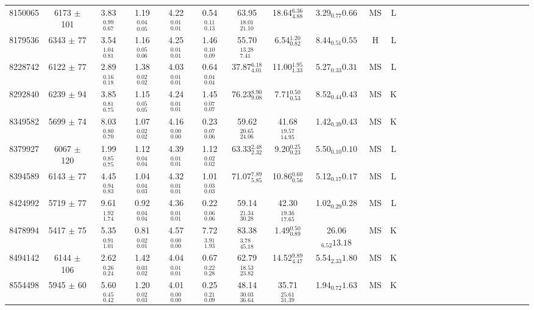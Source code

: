 \begin{table}
\begin{tabular}{cccccccccccccccccccccccccc}
8150065  & 6173 $\pm$ 101& 3.83$_{0.67}^{0.99}$ & 1.19$_{0.05}^{0.04}$ & 4.22$_{0.01}^{0.01}$ & 0.54$_{0.13}^{0.11}$ & 63.95$_{21.10}^{18.01}$ & 18.64$_{4.88}^{6.36}$ & 3.29$_{0.77}{0.66}$ & MS & L \\
8179536  & 6343 $\pm$ 77 & 3.54$_{0.81}^{1.04}$ & 1.16$_{0.06}^{0.05}$ & 4.25$_{0.01}^{0.01}$ & 1.46$_{0.09}^{0.10}$ & 55.70$_{7.41}^{13.28}$ & 6.54$_{0.82}^{1.20}$ & 8.44$_{0.51}{0.55}$ & H & L \\
8228742  & 6122 $\pm$ 77 & 2.89$_{0.18}^{0.16}$ & 1.38$_{0.02}^{0.02}$ & 4.03$_{0.01}^{0.01}$ & 0.64$_{0.04}^{0.04}$ & 37.87$_{4.01}^{6.18}$ & 11.00$_{1.33}^{1.95}$ & 5.27$_{0.33}{0.31}$ & MS & L \\
8292840  & 6239 $\pm$ 94 & 3.85$_{0.75}^{0.81}$ & 1.15$_{0.05}^{0.05}$ & 4.24$_{0.01}^{0.01}$ & 1.45$_{0.07}^{0.07}$ & 76.23$_{9.08}^{8.90}$ & 7.71$_{0.53}^{0.50}$ & 8.52$_{0.44}{0.43}$ & MS & K \\
8349582  & 5699 $\pm$ 74 & 8.03$_{0.70}^{0.80}$ & 1.07$_{0.02}^{0.02}$ & 4.16$_{0.00}^{0.00}$ & 0.23$_{0.06}^{0.07}$ & 59.62$_{24.06}^{20.65}$ & 41.68$_{14.95}^{19.57}$ & 1.42$_{0.39}{0.43}$ & MS & K \\
8379927  & 6067 $\pm$ 120& 1.99$_{0.75}^{0.85}$ & 1.12$_{0.04}^{0.04}$ & 4.39$_{0.01}^{0.01}$ & 1.12$_{0.02}^{0.02}$ & 63.33$_{2.32}^{2.48}$ & 9.20$_{0.23}^{0.25}$ & 5.50$_{0.10}{0.10}$ & MS & L \\
8394589  & 6143 $\pm$ 77 & 4.45$_{0.83}^{0.94}$ & 1.04$_{0.03}^{0.04}$ & 4.32$_{0.01}^{0.01}$ & 1.01$_{0.03}^{0.03}$ & 71.07$_{5.85}^{7.89}$ & 10.86$_{0.56}^{0.60}$ & 5.12$_{0.17}{0.17}$ & MS & L \\
8424992  & 5719 $\pm$ 77 & 9.61$_{1.74}^{1.92}$ & 0.92$_{0.04}^{0.04}$ & 4.36$_{0.01}^{0.01}$ & 0.22$_{0.06}^{0.06}$ & 59.14$_{30.28}^{21.34}$ & 42.30$_{17.65}^{19.36}$ & 1.02$_{0.29}{0.28}$ & MS & L \\
8478994  & 5417 $\pm$ 75 & 5.35$_{1.01}^{0.91}$ & 0.81$_{0.01}^{0.02}$ & 4.57$_{0.00}^{0.00}$ & 7.72$_{1.93}^{3.91}$ & 83.38$_{45.18}^{3.78}$ & 1.49$_{0.89}^{0.50}$ & 26.06$_{6.52}{13.18}$ & MS & K \\
8494142  & 6144 $\pm$ 106 & 2.62$_{0.24}^{0.26}$ & 1.42$_{0.02}^{0.03}$ & 4.04$_{0.01}^{0.01}$ & 0.67$_{0.28}^{0.22}$ & 62.79$_{23.82}^{18.53}$ & 14.52$_{4.47}^{9.89}$ & 5.54$_{2.33}{1.80}$ & MS & K \\
8554498  & 5945 $\pm$ 60 & 5.60$_{0.42}^{0.45}$ & 1.20$_{0.03}^{0.02}$ & 4.01$_{0.00}^{0.00}$ & 0.25$_{0.09}^{0.21}$ & 48.14$_{36.64}^{30.03}$ & 35.71$_{31.39}^{25.61}$ & 1.94$_{0.72}{1.63}$ & MS & K \\

\end{tabular}
\end{table}
